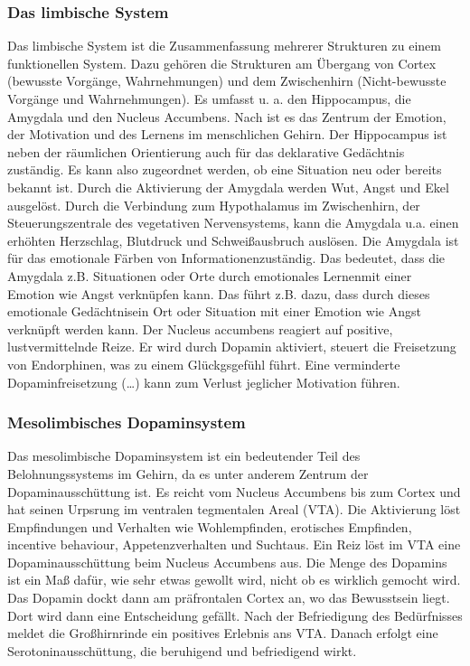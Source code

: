 \subsubsection{Das limbische System}
Das limbische System ist die Zusammenfassung mehrerer Strukturen zu einem funktionellen System. Dazu gehören die Strukturen am \glqq Übergang von Cortex (bewusste Vorgänge, Wahrnehmungen) und dem Zwischenhirn (Nicht-bewusste Vorgänge und Wahrnehmungen).\grqq \citep[S. 36]{Derouiche.2011} Es umfasst u. a. den Hippocampus, die Amygdala und den Nucleus Accumbens. Nach \citet[S. 270]{Kirschbaum.2008} ist es das  \glqq Zentrum der Emotion, der Motivation und des Lernens im menschlichen Gehirn.\grqq 
\newline Der Hippocampus ist neben der räumlichen Orientierung auch für das deklarative Gedächtnis zuständig. Es kann also zugeordnet werden, ob eine Situation neu oder bereits bekannt ist. \citep[S. 36]{Derouiche.2011} Durch die Aktivierung der Amygdala werden Wut, Angst und Ekel ausgelöst. Durch die Verbindung zum Hypothalamus im Zwischenhirn, der Steuerungszentrale des vegetativen Nervensystems, kann die Amygdala u.a. einen erhöhten Herzschlag, Blutdruck und Schweißausbruch auslösen. \citep[S. 36f]{Derouiche.2011} Die Amygdala ist für das \glqq emotionale Färben von Informationen\grqq zuständig. \citep[S. 12]{Kirschbaum.2008} Das bedeutet, dass die Amygdala z.B. Situationen oder Orte durch \glqq emotionales Lernen\grqq mit einer Emotion wie Angst verknüpfen kann. Das führt z.B. dazu, dass durch dieses \glqq emotionale Gedächtnis\grqq ein Ort oder Situation mit einer Emotion wie Angst verknüpft werden kann. \citep[S. 37]{Derouiche.2011}    
\newline Der Nucleus accumbens reagiert auf positive, lustvermittelnde Reize. Er wird durch Dopamin aktiviert, steuert die Freisetzung von Endorphinen, was zu einem Glückgsgefühl führt. \glqq Eine verminderte Dopaminfreisetzung (…) kann zum Verlust jeglicher Motivation führen.\grqq \citep[S. 11]{Nowka.2013}

\subsubsection{Mesolimbisches Dopaminsystem}
Das mesolimbische Dopaminsystem ist ein bedeutender Teil des Belohnungssystems im Gehirn, da es unter anderem Zentrum der Dopaminausschüttung ist. Es  reicht vom Nucleus Accumbens bis zum Cortex und hat seinen Urpsrung im ventralen tegmentalen Areal (VTA). \citep[S. 11]{Nowka.2013} Die Aktivierung löst \glqq Empfindungen und Verhalten wie Wohlempfinden, erotisches Empfinden, \glqq incentive behaviour\grqq, Appetenzverhalten und Sucht\grqq aus. \cite[S. 37]{Derouiche.2011} 
\newline Ein Reiz löst im VTA eine Dopaminausschüttung beim Nucleus Accumbens aus. Die Menge des Dopamins ist ein Maß dafür, wie sehr etwas gewollt wird, nicht ob es wirklich gemocht wird. Das Dopamin dockt dann am präfrontalen Cortex an, wo das Bewusstsein liegt. Dort wird dann eine Entscheidung gefällt. Nach der Befriedigung des Bedürfnisses meldet die Großhirnrinde ein positives Erlebnis ans VTA. Danach erfolgt eine Serotoninausschüttung, die beruhigend und befriedigend wirkt. \cite[S. 16]{Seelbach.2011}

